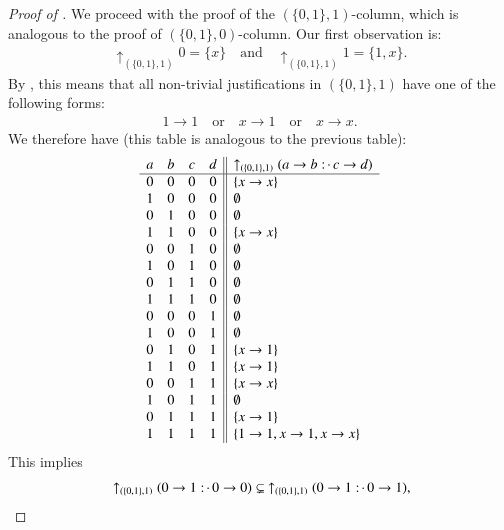 \documentclass[11pt]{amsart}
\theoremstyle{definition} %
\newcommand{\righttherefore}{:\joinrel\cdot\,}
\begin{document}
\begin{proof}[Proof of ]
We proceed with the proof of the $(\{0,1\},1)$-column, which is analogous to the proof of $(\{0,1\},0)$-column. Our first observation is:
\begin{align*} 
	\uparrow_{(\{0,1\},1)} 0=\{x\} \quad\text{and}\quad \uparrow_{(\{0,1\},1)} 1=\{1,x\}.
\end{align*} By , this means that all non-trivial justifications in $(\{0,1\},1)$ have one of the following forms:
\begin{align*} 
	1\to 1 \quad\text{or}\quad x\to 1 \quad\text{or}\quad x\to x.
\end{align*} We therefore have (this table is analogous to the previous table):
\begin{align*}
\begin{array}{cccc||l}
	a & b & c & d & \uparrow_{(\{0,1\},1)}(a\to b\righttherefore c\to d)\\
	\hline
	0 & 0 & 0 & 0 & \{x\to x\}\\
	1 & 0 & 0 & 0 & \emptyset\\
	0 & 1 & 0 & 0 & \emptyset\\
	1 & 1 & 0 & 0 & \{x\to x\}\\
	0 & 0 & 1 & 0 & \emptyset\\
	1 & 0 & 1 & 0 & \emptyset\\ %
	0 & 1 & 1 & 0 & \emptyset\\
	1 & 1 & 1 & 0 & \emptyset\\ %
	0 & 0 & 0 & 1 & \emptyset\\
	1 & 0 & 0 & 1 & \emptyset\\
	0 & 1 & 0 & 1 & \{x\to 1\}\\
	1 & 1 & 0 & 1 & \{x\to 1\}\\
	0 & 0 & 1 & 1 & \{x\to x\}\\
	1 & 0 & 1 & 1 & \emptyset\\ %
	0 & 1 & 1 & 1 & \{x\to 1\}\\
	1 & 1 & 1 & 1 & \{1\to 1,x\to 1,x\to x\}
\end{array}
\end{align*} This implies
\begin{align*} 
	&\uparrow_{(\{0,1\},1)}(0\to 1\righttherefore 0\to 0)\subsetneq\ \uparrow_{(\{0,1\},1)}(0\to 1\righttherefore 0\to 1),\\

\end{align*}
\end{proof}
\end{document}
